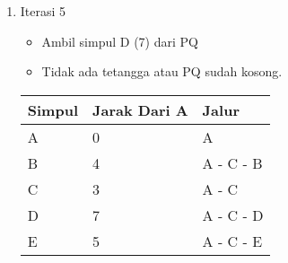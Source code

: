 \begin{enumerate}
    \item Iterasi 5
    \begin{itemize}
        \item Ambil simpul D (7) dari PQ
        \item Tidak ada tetangga atau PQ sudah kosong.
    \end{itemize}
    \begin{table}[h]
        \begin{tabular}{|l|l|l|}
        \hline
            \textbf{Simpul} & \textbf{Jarak Dari A} & \textbf{Jalur} \\ \hline
            A               & 0                     & A     \\ \hline
            B               & 4                     & A - C - B     \\ \hline
            C               & 3                     & A - C     \\ \hline
            D               & 7                     & A - C - D     \\ \hline
            E               & 5                     & A - C - E     \\ \hline
        \end{tabular}
    \end{table}
\end{enumerate}

